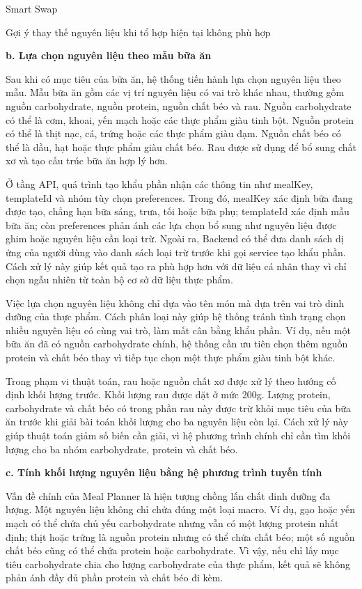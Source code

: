\documentclass[12pt, a4paper]{report}
\begin{document}
Smart Swap

Gợi ý thay thế nguyên liệu khi tổ hợp hiện tại không phù hợp

\textbf{b. Lựa chọn nguyên liệu theo mẫu bữa ăn}

Sau khi có mục tiêu của bữa ăn, hệ thống tiến hành lựa chọn nguyên liệu theo mẫu. Mẫu bữa ăn gồm các vị trí nguyên liệu có vai trò khác nhau, thường gồm nguồn carbohydrate, nguồn protein, nguồn chất béo và rau. Nguồn carbohydrate có thể là cơm, khoai, yến mạch hoặc các thực phẩm giàu tinh bột. Nguồn protein có thể là thịt nạc, cá, trứng hoặc các thực phẩm giàu đạm. Nguồn chất béo có thể là dầu, hạt hoặc thực phẩm giàu chất béo. Rau được sử dụng để bổ sung chất xơ và tạo cấu trúc bữa ăn hợp lý hơn.

Ở tầng API, quá trình tạo khẩu phần nhận các thông tin như mealKey, templateId và nhóm tùy chọn preferences. Trong đó, mealKey xác định bữa đang được tạo, chẳng hạn bữa sáng, trưa, tối hoặc bữa phụ; templateId xác định mẫu bữa ăn; còn preferences phản ánh các lựa chọn bổ sung như nguyên liệu được ghim hoặc nguyên liệu cần loại trừ. Ngoài ra, Backend có thể đưa danh sách dị ứng của người dùng vào danh sách loại trừ trước khi gọi service tạo khẩu phần. Cách xử lý này giúp kết quả tạo ra phù hợp hơn với dữ liệu cá nhân thay vì chỉ chọn ngẫu nhiên từ toàn bộ cơ sở dữ liệu thực phẩm.

Việc lựa chọn nguyên liệu không chỉ dựa vào tên món mà dựa trên vai trò dinh dưỡng của thực phẩm. Cách phân loại này giúp hệ thống tránh tình trạng chọn nhiều nguyên liệu có cùng vai trò, làm mất cân bằng khẩu phần. Ví dụ, nếu một bữa ăn đã có nguồn carbohydrate chính, hệ thống cần ưu tiên chọn thêm nguồn protein và chất béo thay vì tiếp tục chọn một thực phẩm giàu tinh bột khác.

Trong phạm vi thuật toán, rau hoặc nguồn chất xơ được xử lý theo hướng cố định khối lượng trước. Khối lượng rau được đặt ở mức 200g. Lượng protein, carbohydrate và chất béo có trong phần rau này được trừ khỏi mục tiêu của bữa ăn trước khi giải bài toán khối lượng cho ba nguyên liệu còn lại. Cách xử lý này giúp thuật toán giảm số biến cần giải, vì hệ phương trình chính chỉ cần tìm khối lượng cho ba nhóm carbohydrate, protein và chất béo.

\textbf{c. Tính khối lượng nguyên liệu bằng hệ phương trình tuyến tính}

Vấn đề chính của Meal Planner là hiện tượng chồng lấn chất dinh dưỡng đa lượng. Một nguyên liệu không chỉ chứa đúng một loại macro. Ví dụ, gạo hoặc yến mạch có thể chứa chủ yếu carbohydrate nhưng vẫn có một lượng protein nhất định; thịt hoặc trứng là nguồn protein nhưng có thể chứa chất béo; một số nguồn chất béo cũng có thể chứa protein hoặc carbohydrate. Vì vậy, nếu chỉ lấy mục tiêu carbohydrate chia cho lượng carbohydrate của thực phẩm, kết quả sẽ không phản ánh đầy đủ phần protein và chất béo đi kèm.
\end{document}
